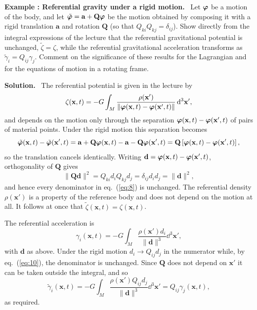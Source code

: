 \documentclass[a4paper,12pt]{paper}
\newcounter{example}
\renewenvironment{example}[1]{%
  \refstepcounter{example}%
  \begin{mdframed}[linewidth=1pt,innertopmargin=6pt,innerbottommargin=6pt]%
  \noindent\textbf{Example \theexample: #1.}\ }{%
  \end{mdframed}}
\newenvironment{solution}{\par\noindent\textbf{Solution.}\ }{\par\medskip}
\begin{document}
\begin{example}{Referential gravity under a rigid motion}
Let $\bm{\varphi}$ be a motion of the body, and let $\tilde{\bm{\varphi}}=\mathbf{a}+\mathbf{Q}\bm{\varphi}$ be the motion
obtained by composing it with a rigid translation $\mathbf{a}$ and rotation $\mathbf{Q}$ (so that
$Q_{ki}Q_{kj}=\delta_{ij}$). Show directly from the integral expressions of the lecture that the
referential gravitational potential is unchanged, $\tilde{\zeta}=\zeta$, while the referential
gravitational acceleration transforms as $\tilde{\gamma}_{i}=Q_{ij}\gamma_{j}$. Comment on the
significance of these results for the Lagrangian and for the equations of motion in a rotating frame.
\end{example}

\begin{solution}
The referential potential is given in the lecture by
\begin{equation}
\zeta(\mathbf{x},t)=-G\int_{M}\frac{\rho(\mathbf{x}')}{\|\bm{\varphi}(\mathbf{x},t)-\bm{\varphi}(\mathbf{x}',t)\|}\,\mathrm{d}^{3}\mathbf{x}',
\label{eq:8}
\end{equation}
and depends on the motion only through the separation $\bm{\varphi}(\mathbf{x},t)-\bm{\varphi}(\mathbf{x}',t)$
of pairs of material points. Under the rigid motion this separation becomes
\begin{equation}
\tilde{\bm{\varphi}}(\mathbf{x},t)-\tilde{\bm{\varphi}}(\mathbf{x}',t)
=\mathbf{a}+\mathbf{Q}\bm{\varphi}(\mathbf{x},t)-\mathbf{a}-\mathbf{Q}\bm{\varphi}(\mathbf{x}',t)
=\mathbf{Q}\left[\bm{\varphi}(\mathbf{x},t)-\bm{\varphi}(\mathbf{x}',t)\right],
\label{eq:9}
\end{equation}
so the translation cancels identically. Writing $\mathbf{d}=\bm{\varphi}(\mathbf{x},t)-\bm{\varphi}(\mathbf{x}',t)$,
orthogonality of $\mathbf{Q}$ gives
\begin{equation}
\|\mathbf{Q}\mathbf{d}\|^{2}=Q_{ki}d_{i}Q_{kj}d_{j}=\delta_{ij}d_{i}d_{j}=\|\mathbf{d}\|^{2},
\label{eq:10}
\end{equation}
and hence every denominator in eq.~(\ref{eq:8}) is unchanged. The referential density $\rho(\mathbf{x}')$
is a property of the reference body and does not depend on the motion at all. It follows at once that
$\tilde{\zeta}(\mathbf{x},t)=\zeta(\mathbf{x},t)$.

The referential acceleration is
\begin{equation}
\gamma_{i}(\mathbf{x},t)=-G\int_{M}\frac{\rho(\mathbf{x}')d_{i}}{\|\mathbf{d}\|^{3}}\dd^{3}\mathbf{x}',
\label{eq:11}
\end{equation}
with $\mathbf{d}$ as above. Under the rigid motion $d_{i}\rightarrow Q_{ij}d_{j}$ in the numerator
while, by eq.~(\ref{eq:10}), the denominator is unchanged. Since $\mathbf{Q}$ does not depend on
$\mathbf{x}'$ it can be taken outside the integral, and so
\begin{equation}
\tilde{\gamma}_{i}(\mathbf{x},t)=-G\int_{M}\frac{\rho(\mathbf{x}')Q_{ij}d_{j}}{\|\mathbf{d}\|^{3}}\dd^{3}\mathbf{x}'
=Q_{ij}\gamma_{j}(\mathbf{x},t),
\label{eq:12}
\end{equation}
as required.


\end{solution}
\end{document}
